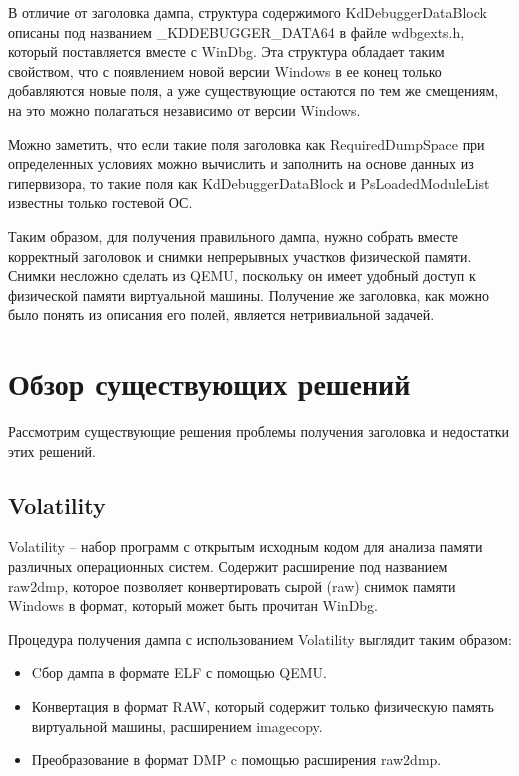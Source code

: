 \documentclass{mipt-thesis-bs}
\begin{document}
В отличие от заголовка дампа, структура содержимого KdDebuggerDataBlock описаны под названием {\_}KDDEBUGGER{\_}DATA64 в файле wdbgexts.h, который поставляется вместе с WinDbg. Эта структура обладает таким свойством, что с появлением новой версии Windows в ее конец только добавляются новые поля, а уже существующие остаются по тем же смещениям, на это можно полагаться независимо от версии Windows.

Можно заметить, что если такие поля заголовка как RequiredDumpSpace при определенных условиях можно вычислить и заполнить на основе данных из гипервизора, то такие поля как KdDebuggerDataBlock и PsLoadedModuleList известны только гостевой ОС.

Таким образом, для получения правильного дампа, нужно собрать вместе корректный заголовок и снимки непрерывных участков физической памяти. Снимки несложно сделать из QEMU, поскольку он имеет удобный доступ к физической памяти виртуальной машины. Получение же заголовка, как можно было понять из описания его полей, является нетривиальной задачей.

\chapter{Обзор существующих решений}

Рассмотрим существующие решения проблемы получения заголовка и недостатки этих решений.

\section*{Volatility}

Volatility -- набор программ с открытым исходным кодом для анализа памяти различных операционных систем. Содержит расширение под названием raw2dmp, которое позволяет конвертировать сырой (raw) снимок памяти Windows в формат, который может быть прочитан WinDbg.

Процедура получения дампа с использованием Volatility выглядит таким образом:
\begin{itemize}
    \item Cбор дампа в формате ELF с помощью QEMU.
    \item Конвертация в формат RAW, который содержит только физическую память виртуальной машины, расширением imagecopy.
    \item Преобразование в формат DMP c помощью расширения raw2dmp\cite{lpblog}.
\end{itemize}
\end{document}
